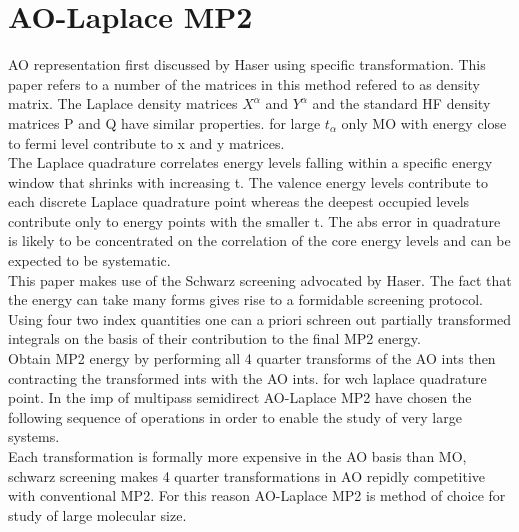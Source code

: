 \documentclass[10pt, draft]{article}
\begin{document}
\section{AO-Laplace MP2}
AO representation first discussed by Haser using specific transformation.  This paper refers to a number of the matrices in this method refered to as density matrix.  The Laplace density matrices $X^\alpha$ and $Y^\alpha$ and the standard HF density matrices P and Q have similar properties.  for large $t_\alpha$ only MO with energy close to fermi level contribute to x and y matrices.  \\
The Laplace quadrature correlates energy levels falling within a specific energy window that shrinks with increasing t. The valence energy levels contribute to each discrete Laplace quadrature point whereas the deepest occupied levels contribute only to energy points with the smaller t.  The abs error in quadrature is likely to be concentrated on the correlation of the core energy levels and can be expected to be systematic.\\
This paper makes use of the Schwarz screening advocated by Haser.  The fact that the energy can take many forms gives rise to a formidable screening protocol.  Using four two index quantities  one can a priori schreen out partially transformed integrals on the basis  of their contribution to the final MP2 energy. \\
Obtain MP2 energy by performing all 4 quarter transforms of the AO ints then contracting the transformed ints with the AO ints.  for wch laplace quadrature point.  In the imp of multipass semidirect AO-Laplace MP2 have chosen the following sequence of operations in order to enable the study of very large systems.  \\
Each transformation is formally more expensive in the AO basis than MO, schwarz screening makes 4 quarter transformations in AO repidly competitive with conventional MP2.  For this reason AO-Laplace MP2 is method of choice for study of large molecular size.  
\end{document}
